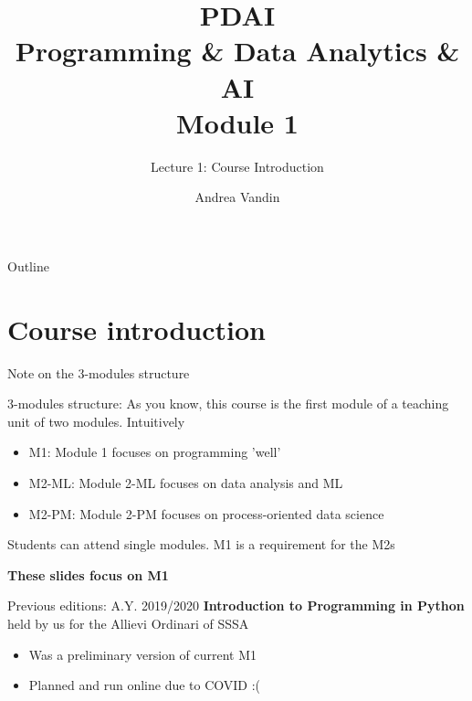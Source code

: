 \documentclass{beamer}%
\title{PDAI\\ Programming \& Data Analytics \& AI \\ Module 1
}
\subtitle{Lecture 1: Course Introduction}
\date{%
}
\begin{document}
\frame{\titlepage}
\author{Andrea Vandin}


\begin{frame}{Outline}
\tableofcontents
\end{frame}

\section{Course introduction}

\begin{frame}{Note on the 3-modules structure}
	\begin{block}{3-modules structure: %
		}
		As you know, this course is the first module of a teaching unit of two modules. Intuitively
		\begin{itemize}
			\item M1: Module 1 focuses on programming 'well'
			\item M2-ML: Module 2-ML focuses  on data analysis and ML
			\item M2-PM: Module 2-PM focuses on process-oriented data science
		\end{itemize}
		Students can attend single modules. M1 is a requirement for the M2s
		\vspace{-0.4cm}
		\begin{center}\textbf{These slides focus on M1}\end{center}
	\end{block}	
\pause
	\begin{block}{Previous editions: A.Y. 2019/2020}
		\textbf{Introduction to Programming in Python} held by us 
		for the Allievi Ordinari of SSSA
		\begin{itemize}
			\item Was a preliminary version of current M1
			\item Planned and run online due to COVID :(
		\end{itemize}
	\end{block}
\end{frame}
\end{document}
